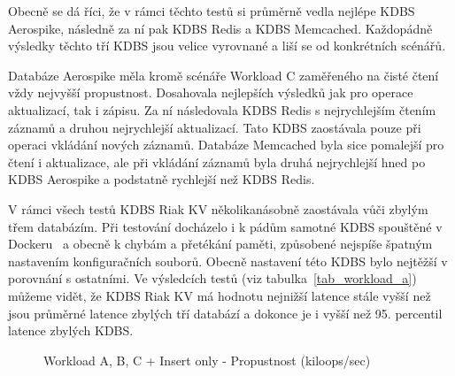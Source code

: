 \documentclass[czech,master,dept460,male,csharp,cpdeclaration]{diploma}
\begin{document}
	Obecně se dá říci, že v rámci těchto testů si průměrně vedla nejlépe KDBS Aerospike, následně za ní pak KDBS Redis a KDBS Memcached. Každopádně výsledky těchto tří KDBS jsou velice vyrovnané a liší se od konkrétních scénářů.
	
	Databáze Aerospike měla kromě scénáře Workload C zaměřeného na čisté čtení vždy nejvyšší propustnost. Dosahovala nejlepších výsledků jak pro operace aktualizací, tak i zápisu. Za ní následovala KDBS Redis s nejrychlejším čtením záznamů a druhou nejrychlejší aktualizací. Tato KDBS zaostávala pouze při operaci vkládání nových záznamů. Databáze Memcached byla sice pomalejší pro čtení i aktualizace, ale při vkládání záznamů byla druhá nejrychlejší hned po KDBS Aerospike a podstatně rychlejší než KDBS Redis.
	
	V rámci všech testů KDBS Riak KV několikanásobně zaostávala vůči zbylým třem databázím. Při testování docházelo i k pádům samotné KDBS spouštěné v Dockeru~\cite{docker} a obecně k chybám a přetékání paměti, způsobené nejspíše špatným nastavením konfiguračních souborů. Obecně nastavení této KDBS bylo nejtěžší v porovnání s ostatními. Ve výsledcích testů (viz tabulka~\ref{tab_workload_a}) můžeme vidět, že KDBS Riak KV má hodnotu nejnižší latence stále vyšší než jsou průměrné latence zbylých tří databází a dokonce je i vyšší než 95. percentil latence zbylých KDBS.
	
	\begin{figure}
		\centering
		\caption{Workload A, B, C + Insert only - Propustnost (kiloops/sec)}
		\label{graph_Workloads A, B, C + Insert only - Throughput (kiloops/sec)}
	\end{figure}
	
\end{document}
